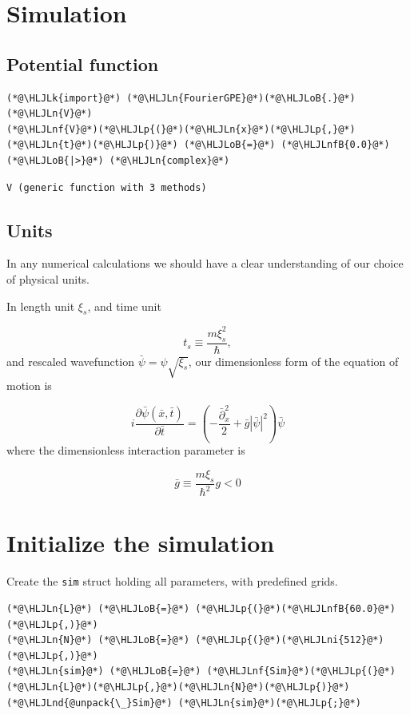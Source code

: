 \documentclass[12pt,a4paper]{article}
\newcommand{\HLJLk}[1]{\textcolor[RGB]{148,91,176}{\textbf{#1}}}
\newcommand{\HLJLn}[1]{#1}
\newcommand{\HLJLnd}[1]{\textcolor[RGB]{214,102,97}{#1}}
\newcommand{\HLJLnf}[1]{\textcolor[RGB]{66,102,213}{#1}}
\newcommand{\HLJLnfB}[1]{\textcolor[RGB]{59,151,46}{#1}}
\newcommand{\HLJLni}[1]{\textcolor[RGB]{59,151,46}{#1}}
\newcommand{\HLJLoB}[1]{\textcolor[RGB]{102,102,102}{\textbf{#1}}}
\newcommand{\HLJLp}[1]{#1}
\begin{document}
\section{Simulation}
\subsection{Potential function}

\begin{lstlisting}
(*@\HLJLk{import}@*) (*@\HLJLn{FourierGPE}@*)(*@\HLJLoB{.}@*)(*@\HLJLn{V}@*)
(*@\HLJLnf{V}@*)(*@\HLJLp{(}@*)(*@\HLJLn{x}@*)(*@\HLJLp{,}@*)(*@\HLJLn{t}@*)(*@\HLJLp{)}@*) (*@\HLJLoB{=}@*) (*@\HLJLnfB{0.0}@*) (*@\HLJLoB{|>}@*) (*@\HLJLn{complex}@*)
\end{lstlisting}

\begin{lstlisting}
V (generic function with 3 methods)
\end{lstlisting}


\subsection{Units}
In any numerical calculations we should have a clear understanding of our choice of physical units.

In length unit $\xi_s$, and time unit

\[
t_s\equiv \frac{m \xi_s^2}{\hbar},
\]
and rescaled wavefunction $\bar\psi = \psi\sqrt{\xi_s}$, our dimensionless form of the equation of motion is

\[
i\frac{\partial \bar\psi(\bar x,\bar t)}{\partial \bar t}=\left(-\frac{\bar\partial_x^2}{2}+\bar g|\bar\psi|^2\right)\bar\psi
\]
where the dimensionless interaction parameter is

\[
\bar g \equiv \frac{m\xi_s}{\hbar^2}g < 0
\]
\section{Initialize the simulation}
Create the \texttt{sim} struct holding all parameters, with predefined grids.


\begin{lstlisting}
(*@\HLJLn{L}@*) (*@\HLJLoB{=}@*) (*@\HLJLp{(}@*)(*@\HLJLnfB{60.0}@*)(*@\HLJLp{,)}@*)
(*@\HLJLn{N}@*) (*@\HLJLoB{=}@*) (*@\HLJLp{(}@*)(*@\HLJLni{512}@*)(*@\HLJLp{,)}@*)
(*@\HLJLn{sim}@*) (*@\HLJLoB{=}@*) (*@\HLJLnf{Sim}@*)(*@\HLJLp{(}@*)(*@\HLJLn{L}@*)(*@\HLJLp{,}@*)(*@\HLJLn{N}@*)(*@\HLJLp{)}@*)
(*@\HLJLnd{@unpack{\_}Sim}@*) (*@\HLJLn{sim}@*)(*@\HLJLp{;}@*)
\end{lstlisting}
\end{document}
